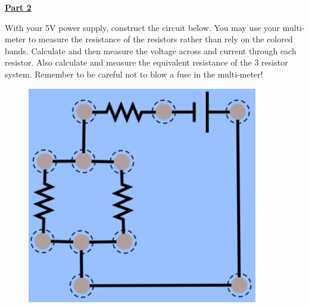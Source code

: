 \underline{\textbf{Part 2}} \par

With your 5V power supply, construct the circuit below.
You may use your multi-meter to measure the resistance of the resistors rather than rely on the colored bands.
Calculate and then measure the voltage across and current through each resistor.
Also calculate and measure the equivalent resistance of the 3 resistor system.
Remember to be careful not to blow a fuse in the multi-meter!

\begin{figure}[H]
\includegraphics[scale=0.90]{figures/resistor-circuits/mixed-circuit.png}
\end{figure}

\pagebreak \clearpage
